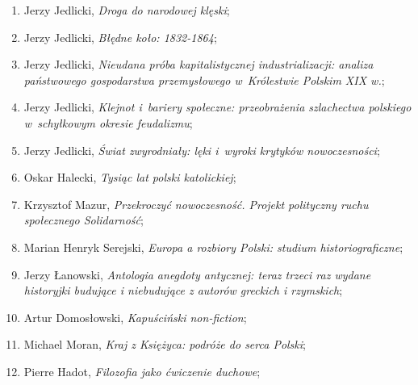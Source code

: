 \documentclass[a4paper,11pt]{article}
\begin{document}
\begin{enumerate}
\item Jerzy Jedlicki, \textit{Droga do narodowej klęski};



\item Jerzy Jedlicki, \textit{Błędne koło: 1832-1864};



\item Jerzy Jedlicki, \textit{Nieudana próba kapitalistycznej
    industrializacji: analiza państwowego gospodarstwa przemysłowego
    w~Królestwie Polskim XIX w.};



\item Jerzy Jedlicki, \textit{Klejnot i~bariery społeczne: przeobrażenia
    szlachectwa polskiego w~schyłkowym okresie feudalizmu};



\item Jerzy Jedlicki, \textit{Świat zwyrodniały: lęki i~wyroki krytyków
    nowoczesności};



\item Oskar Halecki, \textit{Tysiąc lat polski katolickiej};



\item Krzysztof Mazur, \textit{Przekroczyć nowoczesność. Projekt
    polityczny ruchu społecznego Solidarność};



\item Marian Henryk Serejski, \textit{Europa a rozbiory Polski: studium
    historiograficzne};



\item Jerzy Łanowski, \textit{Antologia anegdoty antycznej: teraz trzeci
    raz wydane historyjki budujące i niebudujące z autorów greckich i
    rzymskich};



\item Artur Domosłowski, \textit{Kapuściński non-fiction};



\item Michael Moran, \textit{Kraj z Księżyca: podróże do serca Polski};



\item Pierre Hadot, \textit{Filozofia jako ćwiczenie duchowe};




\end{enumerate}
\end{document}
